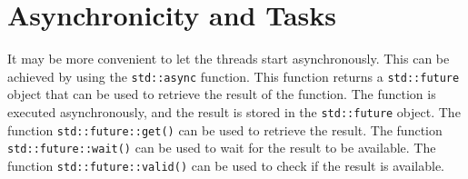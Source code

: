 




   
\section{Asynchronicity and Tasks}
It may be more convenient to let the threads start asynchronously. This can be achieved by using the \lstinline|std::async| function. This function returns a \lstinline|std::future| object that can be used to retrieve the result of the function. The function is executed asynchronously, and the result is stored in the \lstinline|std::future| object. The function \lstinline|std::future::get()| can be used to retrieve the result. The function \lstinline|std::future::wait()| can be used to wait for the result to be available. The function \lstinline|std::future::valid()| can be used to check if the result is available. 

